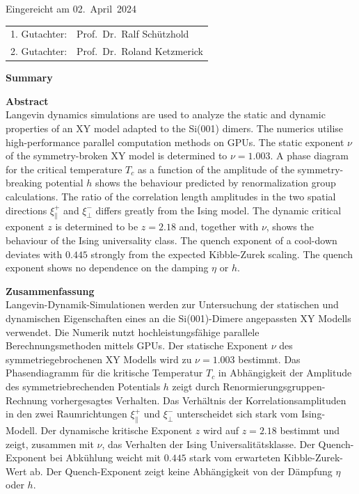 	
	\thispagestyle{empty}\vspace*{48em}
	
	Eingereicht am 02.~April~2024\vspace{1.5em}
	\par{\large\begin{tabular}{ll}
			1. Gutachter: & Prof.~Dr.~Ralf Schützhold\\
			2. Gutachter: & Prof.~Dr.~Roland Ketzmerick \\
	\end{tabular}}
	
	
	\newpage
	\begin{center}\large\bfseries Summary\end{center}
	
	
	\textbf{Abstract} \\
	Langevin dynamics simulations are used to analyze the static and dynamic properties of an XY model adapted to the Si(001) dimers. The numerics utilise high-performance parallel computation methods on GPUs. The static exponent $\nu$ of the symmetry-broken XY model is determined to $\nu = 1.003$. A phase diagram for the critical temperature $T_c$ as a function of the amplitude of the symmetry-breaking potential $h$ shows the behaviour predicted by renormalization group calculations. The ratio of the correlation length amplitudes in the two spatial directions $\xi_\parallel^+$ and $\xi_\perp^-$ differs greatly from the Ising model. The dynamic critical exponent $z$ is determined to be $z=2.18$ and, together with $\nu$, shows the behaviour of the Ising universality class. The quench exponent of a cool-down deviates with $0.445$ strongly from the expected Kibble-Zurek scaling. The quench exponent shows no dependence on the damping $\eta$ or $h$.
	
	\vspace{15em}
	\textbf{Zusammenfassung} \\
	Langevin-Dynamik-Simulationen werden zur Untersuchung der statischen und dynamischen Eigenschaften eines an die Si(001)-Dimere angepassten XY Modells verwendet. Die Numerik nutzt hochleistungsfähige parallele Berechnungsmethoden mittels GPUs. Der statische Exponent $\nu$ des symmetriegebrochenen XY Modells wird zu $\nu = 1.003$ bestimmt. Das Phasendiagramm für die kritische Temperatur $T_c$ in Abhängigkeit der Amplitude des symmetriebrechenden Potentials $h$ zeigt durch Renormierungsgruppen-Rechnung vorhergesagtes Verhalten. Das Verhältnis der Korrelationsamplituden in den zwei Raumrichtungen $\xi_\parallel^+$ und $\xi_\perp^-$ unterscheidet sich stark vom Ising-Modell. Der dynamische kritische Exponent $z$ wird auf $z=2.18$ bestimmt und zeigt, zusammen mit $\nu$, das Verhalten der Ising Universalitätsklasse. Der Quench-Exponent bei Abkühlung weicht mit $0.445$ stark vom erwarteten Kibble-Zurek-Wert ab. Der Quench-Exponent zeigt keine Abhängigkeit von der Dämpfung $\eta$ oder $h$.
	
